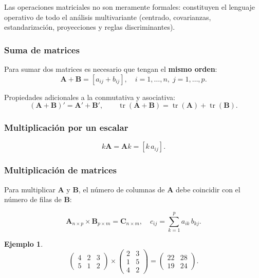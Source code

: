 \documentclass[12pt, a4paper]{article}
\theoremstyle{plain}
\theoremstyle{definition}
\newtheorem{ejemplo}{Ejemplo}[section]
\theoremstyle{remark}
\newcommand{\mat}[1]{\mathbf{#1}}
\newcommand{\tr}{\operatorname{tr}}
\begin{document}
Las operaciones matriciales no son meramente formales: constituyen el lenguaje
operativo de todo el análisis multivariante (centrado, covarianzas,
estandarización, proyecciones y reglas discriminantes).

\subsubsection{Suma de matrices}

Para sumar dos matrices es necesario que tengan el \textbf{mismo orden}:
\[
  \mat{A} + \mat{B} = [a_{ij} + b_{ij}], \quad i=1,\dots,n,\; j=1,\dots,p.
\]

Propiedades adicionales a la conmutativa y asociativa:
\[
  (\mat{A}+\mat{B})' = \mat{A}' + \mat{B}', \qquad
  \tr(\mat{A}+\mat{B}) = \tr(\mat{A}) + \tr(\mat{B}).
\]

\subsubsection{Multiplicación por un escalar}

\[
  k\mat{A} = \mat{A}k = [k\,a_{ij}].
\]

\subsubsection{Multiplicación de matrices}

Para multiplicar $\mat{A}$ y $\mat{B}$, el número de columnas de $\mat{A}$
debe coincidir con el número de filas de $\mat{B}$:

\begin{mdframed}[style=resultado]
\[
  \mat{A}_{n\times p} \times \mat{B}_{p\times m} = \mat{C}_{n\times m},
  \quad c_{ij} = \sum_{k=1}^p a_{ik}\,b_{kj}.
\]
\end{mdframed}

\begin{ejemplo}
\[
  \begin{pmatrix}4&2&3\\5&1&2\end{pmatrix}
  \times
  \begin{pmatrix}2&3\\1&5\\4&2\end{pmatrix}
  =
  \begin{pmatrix}22&28\\19&24\end{pmatrix}.
\]
\end{ejemplo}
\end{document}
